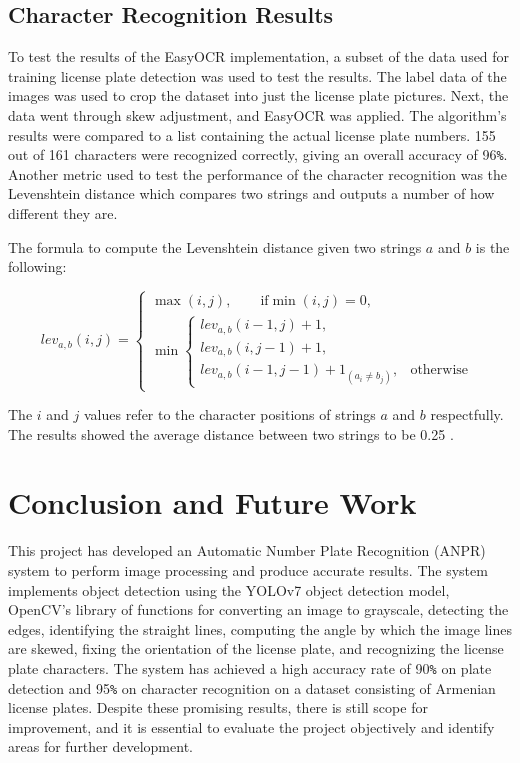 \documentclass[conference]{IEEEtran}
\begin{document}
\subsection{Character Recognition Results}

To test the results of the EasyOCR implementation, a subset of the data used for training license plate detection was used to test the results. The label data of the images was used to crop the dataset into just the license plate pictures. Next, the data went through skew adjustment, and EasyOCR was applied. The algorithm's results were compared to a list containing the actual license plate numbers. 155 out of 161 characters were recognized correctly, giving an overall accuracy of 96\verb|%|. Another metric used to test the performance of the character recognition was the Levenshtein distance which compares two strings and outputs a number of how different they are\cite{b22}. 

The formula to compute the Levenshtein distance given two strings $a$ and $b$ is the following: 

\begin{equation}
lev_{\scriptstyle a,b}(i,j) =
\begin{cases}
    \max(i,j), \qquad \text{if} \min(i,j) = 0, \\
    \min\begin{cases} 
        lev_{\scriptstyle a,b}(i-1,j)+1, \\
        lev_{\scriptstyle a,b}(i,j-1)+1, \\
        lev_{\scriptstyle a,b}(i-1,j-1)+1_{\scriptstyle(a_i \neq b_j)}, & \text{otherwise}
    \end{cases}
\end{cases}
\label{eq:levenshtein}
\end{equation}

The $i$ and $j$ values refer to the character positions of strings $a$ and $b$ respectfully. The results showed the average distance between two strings to be 0.25 \cite{b22}. 

\section{Conclusion and Future Work}

This project has developed an Automatic Number Plate Recognition (ANPR) system to perform image processing and produce accurate results. The system implements object detection using the YOLOv7 object detection model, OpenCV’s library of functions for converting an image to grayscale, detecting the edges, identifying the straight lines, computing the angle by which the image lines are skewed, fixing the orientation of the license plate, and recognizing the license plate characters.  The system has achieved a high accuracy rate of 90\verb|%| on plate detection and 95\verb|%| on character recognition on a dataset consisting of Armenian license plates. Despite these promising results, there is still scope for improvement, and it is essential to evaluate the project objectively and identify areas for further development.
\end{document}
